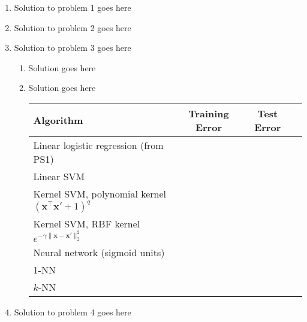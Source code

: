 \documentclass[twoside,10pt]{article}
\theoremstyle{definition}
\theoremstyle{definition}
\theoremstyle{remark}
\renewcommand{\>}{{\rightarrow}}
\newcommand{\1}{{\mathbf 1}}
\newcommand{\0}{{\mathbf 0}}
\newcommand{\x}{{\mathbf x}}
\newcommand\Tstrut{\rule{0pt}{2.6ex}}         %
\newcommand\Bstrut{\rule[-0.9ex]{0pt}{0pt}}   %
\begin{document}
\begin{enumerate}

\item
Solution to problem 1 goes here

%
\item
Solution to problem 2 goes here

%
\item
Solution to problem 3 goes here

\begin{enumerate}
	\item 
	Solution goes here
	\item 
	Solution goes here

\begin{center}
	\begin{tabular}{lccc}
		\hline
		\textbf{Algorithm}  & \textbf{Training Error} & \textbf{Test Error} \\ \hline
		Linear logistic regression (from PS1) &   &  \Tstrut\Bstrut\\ \hline
		Linear SVM &  &   \Tstrut\Bstrut\\ \hline
		Kernel SVM, polynomial kernel $(\x^\top \x' + 1)^q$	&  & \Bstrut\\ \hline
		Kernel SVM, RBF kernel $e^{-\gamma\|\x-\x'\|_2^2}$	 & &  \Bstrut\\ \hline
		Neural network (sigmoid units)  &  & \Tstrut\Bstrut\\ \hline
		1-NN &  &    \Tstrut\Bstrut\\
		\hline
		$k$-NN  &    & \Tstrut\Bstrut\\
		\hline
	\end{tabular}
\end{center}
	
\end{enumerate}
%
\item
Solution to problem 4 goes here


\end{enumerate}
\end{document}
